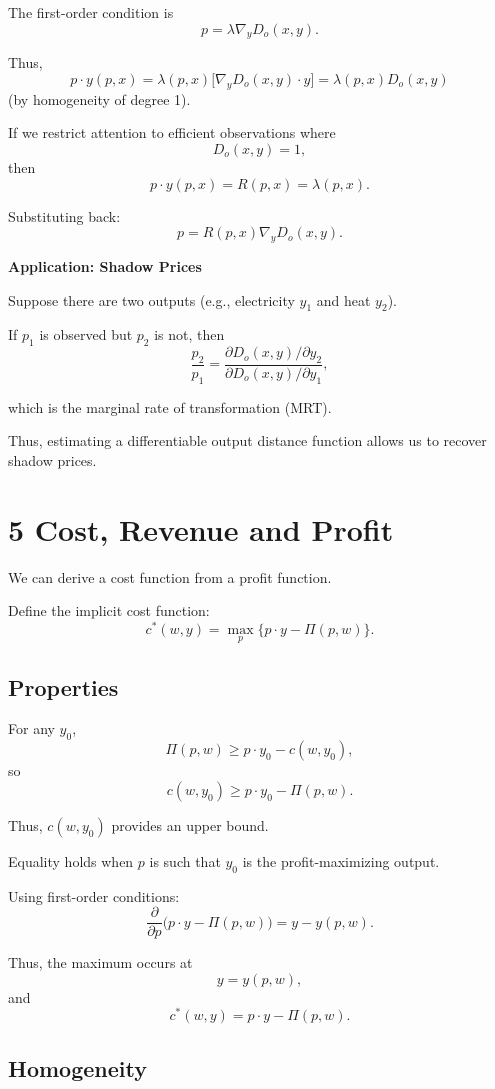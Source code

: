 The first-order condition is
\[
p = \lambda \nabla_y D_o(x,y).
\]

Thus,
\[
p\cdot y(p,x)
=
\lambda(p,x)\bigl[\nabla_y D_o(x,y)\cdot y\bigr]
=
\lambda(p,x) D_o(x,y)
\]
(by homogeneity of degree 1).

If we restrict attention to efficient observations where
\[
D_o(x,y)=1,
\]
then
\[
p\cdot y(p,x)=R(p,x)=\lambda(p,x).
\]

Substituting back:
\[
p = R(p,x)\nabla_y D_o(x,y).
\]

\medskip

\textbf{Application: Shadow Prices}

Suppose there are two outputs (e.g., electricity $y_1$ and heat $y_2$).

If $p_1$ is observed but $p_2$ is not, then
\[
\frac{p_2}{p_1}
=
\frac{\partial D_o(x,y)/\partial y_2}
{\partial D_o(x,y)/\partial y_1},
\]

which is the marginal rate of transformation (MRT).

Thus, estimating a differentiable output distance function allows us
to recover shadow prices.

\section{5 Cost, Revenue and Profit}

We can derive a cost function from a profit function.

Define the implicit cost function:
\[
c^*(w,y)=\max_p \{p\cdot y - \Pi(p,w)\}.
\]

\subsection*{Properties}

For any $y_0$,
\[
\Pi(p,w)\ge p\cdot y_0 - c(w,y_0),
\]
so
\[
c(w,y_0)\ge p\cdot y_0 - \Pi(p,w).
\]

Thus, $c(w,y_0)$ provides an upper bound.

Equality holds when $p$ is such that $y_0$ is the profit-maximizing output.

\medskip

Using first-order conditions:
\[
\frac{\partial}{\partial p}\bigl(p\cdot y - \Pi(p,w)\bigr)
=
y - y(p,w).
\]

Thus, the maximum occurs at
\[
y=y(p,w),
\]
and
\[
c^*(w,y)=p\cdot y - \Pi(p,w).
\]

\subsection*{Homogeneity}

